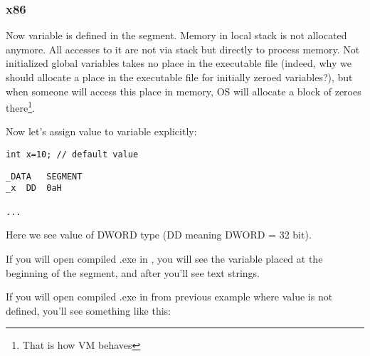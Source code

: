 \subsubsection{x86}



{Now  variable is defined in the  segment. 
Memory in local stack is not allocated anymore. 
All accesses to it are not via stack but directly to process memory. 
Not initialized global variables takes no place in the executable file
(indeed, why we should allocate a place
in the executable file for initially zeroed variables?), but when someone will access this place
in memory, \ac{OS} will allocate a block of zeroes there\footnote{That is how \ac{VM} behaves}.}

{Now let's assign value to variable explicitly:}

\begin{lstlisting}
int x=10; // default value
\end{lstlisting}


\begin{lstlisting}
_DATA	SEGMENT
_x	DD	0aH

...
\end{lstlisting}

{Here we see value  of DWORD type (DD meaning DWORD = 32 bit).}

{If you will open compiled .exe in \IDA, you will see the  variable placed at the beginning of 
the  segment, and after you'll see text strings.}

{If you will open compiled .exe in \IDA from previous example where  value is not defined, 
you'll see something like this:}

